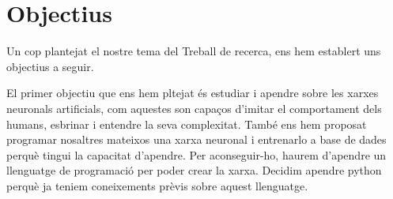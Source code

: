 \chapter{Objectius}
\label{c:objectius}
Un cop plantejat el nostre tema del Treball de recerca, ens hem establert uns objectius a seguir.

El primer objectiu que ens hem pltejat és estudiar i apendre sobre les xarxes neuronals artificials, com aquestes son capaços d'imitar el comportament dels humans, esbrinar i entendre la seva complexitat.
També ens hem proposat programar nosaltres mateixos una xarxa neuronal i entrenarlo a base de dades perquè tingui la capacitat d'apendre.
Per aconseguir-ho, haurem d'apendre un llenguatge de programació per poder crear la xarxa. Decidim apendre python perquè ja teniem coneixements prèvis sobre aquest llenguatge.
